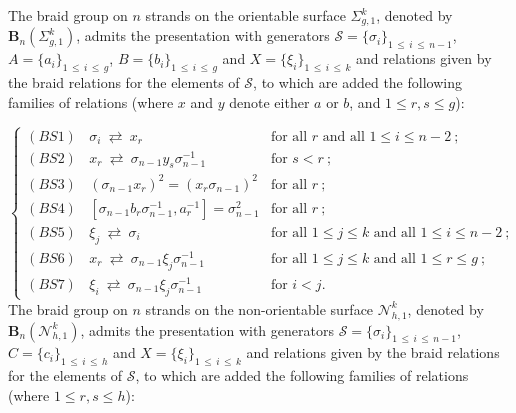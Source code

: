 \documentclass[AHL,Unicode,published]{cedram}
\newcommand{\B}{\ensuremath{\mathbf{B}}}
\newcommand{\sS}{\mathscr{S}}
\newcommand{\N}{\mathscr{N}}
\renewcommand{\leq}{\leqslant}
\begin{document}
\begin{prop}\label{prop:presentation_braid_orientable_surfaces}
The braid group on $n$ strands on the orientable surface $\Sigma_{g,1}^{k}$, denoted by $\B_{n}(\Sigma_{g,1}^{k})$, admits the presentation with generators $\sS=\{\sigma_{i}\} _{1\,\leq\,i\,\leq\,n-1}$, $A=\{a_{i}\} _{1\,\leq\,i\,\leq\,g}$, $B=\{b_{i}\} _{1\,\leq\,i\,\leq\,g}$ and $X=\{\xi_{i}\} _{1\,\leq\,i\,\leq\,k}$ and relations given by the braid relations for the elements of $\sS$, to which are added the following families of relations (where $x$ and $y$ denote either $a$ or $b$, and $1 \leq r, s \leq g$):

\begin{equation}\label{eq:relations_braids_on_orientable_surface}
\begin{cases}
(BS1)\ \text{ }\sigma_i\ \rightleftarrows\ x_r & \text{for all $r$ and all $1\leq i\leq n-2 $}\ ;\\
(BS2)\ \text{ } x_r\ \rightleftarrows\ \sigma_{n-1} y_s \sigma_{n-1}^{-1} & \text{for $s < r$}\ ;\\
(BS3)\ \text{ }(\sigma_{n-1} x_r)^2 = (x_r \sigma_{n-1})^2 & \text{for all $r$}\ ;\\
(BS4)\ \text{ }\left[\sigma_{n-1} b_r \sigma_{n-1}^{-1}, a_r^{-1}\right] = \sigma_{n-1}^2 & \text{for all $r$}\ ;\\
(BS5)\ \text{ }\xi_j\ \rightleftarrows\ \sigma_i & \text{for all $1\leq j \leq k$ and all $1\leq i\leq n-2 $}\ ;\\
(BS6)\ \text{ }x_r\ \rightleftarrows\ \sigma_{n-1} \xi_j \sigma_{n-1}^{-1} & \text{for all $1\leq j \leq k$ and all $1\leq r \leq g$}\ ;\\
(BS7)\ \text{ }\xi_i\ \rightleftarrows\ \sigma_{n-1} \xi_j \sigma_{n-1}^{-1} & \text{for $i < j$}.
\end{cases}
\end{equation}
The braid group on $n$ strands on the non-orientable surface $\N_{h,1}^{k}$, denoted by $\B_{n}(\N_{h,1}^{k})$, admits the presentation with generators $\sS=\{\sigma_{i}\} _{1\,\leq\,i\,\leq\,n-1 }$, $C=\{c_{i}\} _{1\,\leq\,i\,\leq\,h}$ and $X=\{\xi_{i}\} _{1\,\leq\,i\,\leq\,k}$ and relations given by the braid relations for the elements of $\sS$, to which are added the following families of relations (where $1 \leq r, s \leq h$):


\end{prop}
\end{document}
